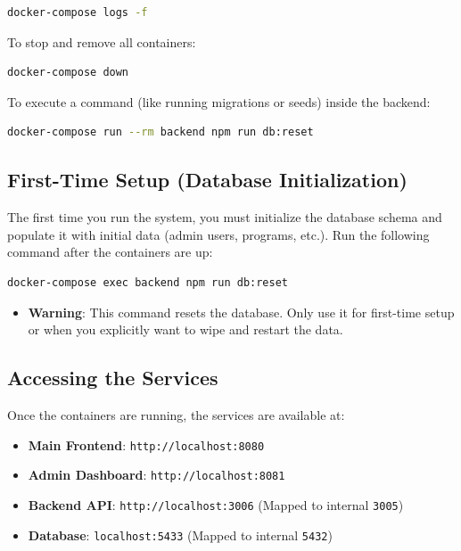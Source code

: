 \documentclass{article}
\begin{document}
\begin{lstlisting}[language=bash]
docker-compose logs -f
\end{lstlisting}

To stop and remove all containers:

\begin{lstlisting}[language=bash]
docker-compose down
\end{lstlisting}

To execute a command (like running migrations or seeds) inside the backend:

\begin{lstlisting}[language=bash]
docker-compose run --rm backend npm run db:reset
\end{lstlisting}

\subsection{First-Time Setup (Database Initialization)}
The first time you run the system, you must initialize the database schema and populate it with initial data (admin users, programs, etc.). Run the following command after the containers are up:

\begin{lstlisting}[language=bash]
docker-compose exec backend npm run db:reset
\end{lstlisting}

\begin{itemize}
    \item \textbf{Warning}: This command resets the database. Only use it for first-time setup or when you explicitly want to wipe and restart the data.
\end{itemize}

\subsection{Accessing the Services}
Once the containers are running, the services are available at:
\begin{itemize}
    \item \textbf{Main Frontend}: \texttt{http://localhost:8080}
    \item \textbf{Admin Dashboard}: \texttt{http://localhost:8081}
    \item \textbf{Backend API}: \texttt{http://localhost:3006} (Mapped to internal \texttt{3005})
    \item \textbf{Database}: \texttt{localhost:5433} (Mapped to internal \texttt{5432})
\end{itemize}
\end{document}
